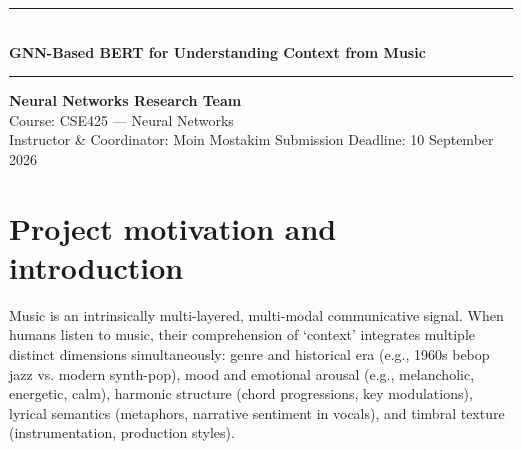 \documentclass[10pt]{article}
\newcommand{\reporttitleblock}[1]{%
  \begin{center}
  \rule{\textwidth}{4pt}\\[0.25in]
  {\fontsize{17}{20}\selectfont\bfseries #1}\\[0.22in]
  \rule{\textwidth}{1pt}
  \end{center}
}
\begin{document}
\reporttitleblock{GNN-Based BERT for Understanding Context from Music}

\begin{center}
{\large\bfseries Neural Networks Research Team}\\[4pt]
Course: CSE425 --- Neural Networks\\
Instructor \& Coordinator: Moin Mostakim \quad\textbar\quad Submission Deadline: 10 September 2026
\end{center}

\vspace{0.15in}

\begin{abstract}
Music context understanding requires jointly modeling localized acoustic textures, harmonic chord sequences, and high-level linguistic semantics (lyrics, metadata tags, and listener-described semantics). Traditional sequence models (CNN/RNN on spectrograms) capture local time-frequency patterns but fail to represent non-local relational structure: how transitions such as C $\rightarrow$ G $\rightarrow$ Am relate to lyrical themes, or how repeated segments form a global song structure graph. In this work, we propose a multi-modal neural framework that combines contextual language representations from BERT / DistilBERT with structural message passing over music structure graphs using Graph Neural Networks (GraphSAGE / GAT). We implement and empirically validate four progressive tasks: (1) multi-label tag prediction with BERT, (2) audio segment GNNs against 2D spectrogram CNN baselines, (3) multi-task cross-attention fusion for joint tag classification and continuous valence/arousal emotion regression (DEAM), and (4) contrastive cross-modal dual-encoder retrieval (MusicCaps) under InfoNCE loss. Our unified model achieves a Macro-F1 of 0.614 and AUC-PR of 0.552, substantially outperforming the audio-only CNN baseline (0.412 Macro-F1) and individual unimodal encoders. We present detailed ablations, t-SNE latent space visualisations, qualitative retrieval analyses, and three comprehensive case studies illustrating structural alignment between acoustic subgraphs and text tokens.
\end{abstract}

\section{Project motivation and introduction}

Music is an intrinsically multi-layered, multi-modal communicative signal. When humans listen to music, their comprehension of `context' integrates multiple distinct dimensions simultaneously: genre and historical era (e.g., 1960s bebop jazz vs. modern synth-pop), mood and emotional arousal (e.g., melancholic, energetic, calm), harmonic structure (chord progressions, key modulations), lyrical semantics (metaphors, narrative sentiment in vocals), and timbral texture (instrumentation, production styles).
\end{document}
